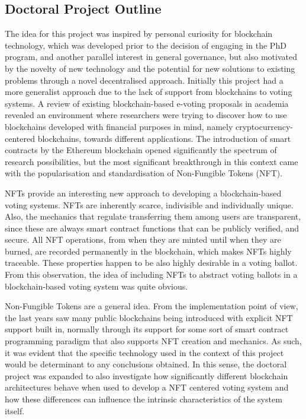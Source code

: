\documentclass[../main.tex]{subfiles}
\begin{document}
\subsection{Doctoral Project Outline}
\label{sec:project_outline}
The idea for this project was inspired by personal curiosity for blockchain technology, which was developed prior to the decision of engaging in the PhD program, and another parallel interest in general governance, but also motivated by the novelty of new technology and the potential for new solutions to existing problems through a novel decentralised approach. Initially this project had a more generalist approach due to the lack of support from blockchains to voting systems. A review of existing blockchain-based e-voting proposals in academia revealed an environment where researchers were trying to discover how to use blockchains developed with financial purposes in mind, namely cryptocurrency-centered blockchains, towards different applications. The introduction of smart contracts by the Ethereum blockchain opened significantly the spectrum of research possibilities, but the most significant breakthrough in this context came with the popularisation and standardisation of Non-Fungible Tokens (NFT).
\par
NFTs provide an interesting new approach to developing a blockchain-based voting systems. NFTs are inherently scarce, indivisible and individually unique. Also, the mechanics that regulate transferring them among users are transparent, since these are always smart contract functions that can be publicly verified, and secure. All NFT operations, from when they are minted until when they are burned, are recorded permanently in the blockchain, which makes NFTs highly traceable. These properties happen to be also highly desirable in a voting ballot. From this observation, the idea of including NFTs to abstract voting ballots in a blockchain-based voting system was quite obvious.
\par
Non-Fungible Tokens are a general idea. From the implementation point of view, the last years saw many public blockchains being introduced with explicit NFT support built in, normally through its support for some sort of smart contract programming paradigm that also supports NFT creation and mechanics. As such, it was evident that the specific technology used in the context of this project would be determinant to any conclusions obtained. In this sense, the doctoral project was expanded to also investigate how significantly different blockchain architectures behave when used to develop a NFT centered voting system and how these differences can influence the intrinsic characteristics of the system itself.
\end{document}
